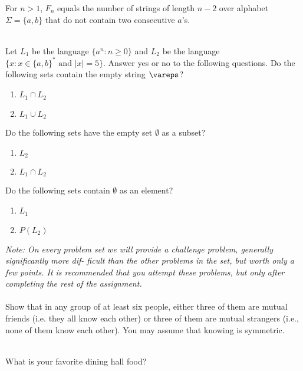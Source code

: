 \documentclass[solution, letterpaper]{cs121}
\begin{document}
\subproblem For $n > 1$, $F_n$ equals the number of strings of length $n-2$ over alphabet $\Sigma = \{a, b\}$ that do not contain two consecutive $a$'s.
\\\\

 
Let $L_1$ be the language $\{ a^n : n \ge 0\}$ and $L_2$ be the language $\{x : x \in \{a, b\}^* \text{ and } |x| = 5\}$. Answer yes or no to the following questions.
\subproblem Do the following sets contain the empty string $\vareps$?
\begin{enumerate}
\item $L_1 \cap L_2$
\item $L_1 \cup L_2$
\end{enumerate}

\subproblem Do the following sets have the empty set $\emptyset$ as a subset?
\begin{enumerate}
\item $L_2$
\item $L_1 \cap L_2$
\end{enumerate}

\subproblem Do the following sets contain $\emptyset$ as an element?
\begin{enumerate}
\item $L_1$
\item $P(L_2)$
\end{enumerate}


\textit{Note: On every problem set we will provide a challenge problem, generally significantly more dif- ficult than the other problems in the set, but worth only a few points. It is recommended that you attempt these problems, but only after completing the rest of the assignment.} \\\\
Show that in any group of at least six people, either three of them are mutual friends (i.e. they all know each other) or three of them are mutual strangers (i.e., none of them know each other). You may assume that knowing is symmetric.
\\\\


What is your favorite dining hall food?
\\\\

\end{document}
